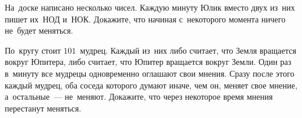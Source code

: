 \begin{problems}
\item
На~доске написано несколько чисел.
Каждую минуту Юлик вместо двух из~них пишет их~НОД и~НОК.
Докажите, что начиная с~некоторого момента ничего не~будет меняться.

\item
По~кругу стоит $101$~мудрец.
Каждый из~них либо считает, что Земля вращается вокруг Юпитера, либо считает,
что Юпитер вращается вокруг Земли.
Один раз в~минуту все мудрецы одновременно оглашают свои мнения.
Сразу после этого каждый мудрец, оба соседа которого думают иначе, чем он,
меняет свое мнение, а~остальные~--- не~меняют.
Докажите, что через некоторое время мнения перестанут меняться.

\end{problems}

